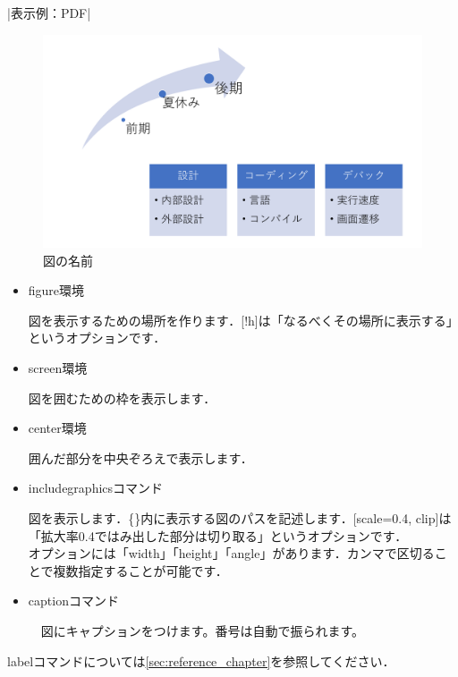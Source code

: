     |表示例：PDF|
    \begin{figure}[!h]
    \begin{screen}
    \begin{center}
        \includegraphics[scale=0.4, clip]{./img/illust.pdf}
        \caption{図の名前}
        \label{fig:図の名前}
    \end{center}
    \end{screen}
    \end{figure}


    \begin{itemize}
        \item figure環境

        図を表示するための場所を作ります．[!h]は「なるべくその場所に表示する」というオプションです．
        \item screen環境

        図を囲むための枠を表示します．
        \item center環境

        囲んだ部分を中央ぞろえで表示します．
        \item includegraphicsコマンド

        図を表示します．\{\}内に表示する図のパスを記述します．[scale=0.4, clip]は「拡大率0.4ではみ出した部分は切り取る」というオプションです．\\
        オプションには「width」「height」「angle」があります．カンマで区切ることで複数指定することが可能です．
	 \item captionコマンド
	
	　図にキャプションをつけます。番号は自動で振られます。
    \end{itemize}
    labelコマンドについては\ref{sec:reference_chapter}を参照してください．

